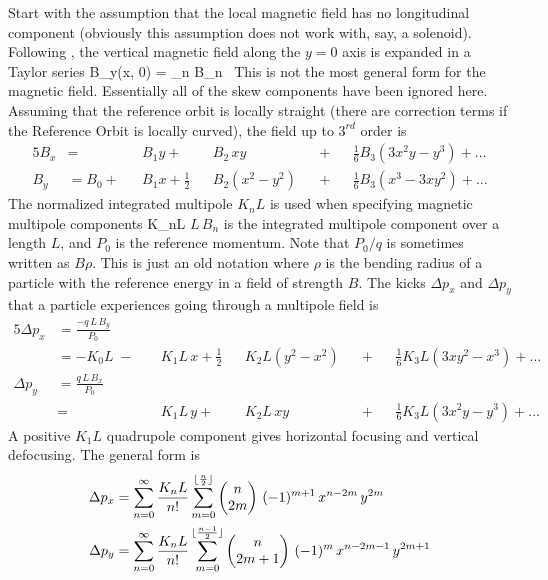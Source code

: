 Start with the assumption that the local magnetic field has no
longitudinal component (obviously this assumption does not work with,
say, a solenoid).  Following \mad, the vertical magnetic field along
the $y = 0$ axis is expanded in a Taylor series
\Begineq
  B_y(x, 0) = \sum_n B_n \, 
\Endeq
This is not the most
general form for the magnetic field. Essentially all of the skew
components have been ignored here. Assuming that the
reference orbit is locally straight (there are correction terms if the
Reference Orbit is locally curved), the field up to $3^{rd}$ order is
\begin{alignat}{5}
  B_x &=           &&B_1 y \plus         &&B_2 \, xy       && \plus && \frac{1}{6} B_3 (3x^2 y - y^3) \plus \ldots \\
  B_y &= B_0 \plus &&B_1 x + \frac{1}{2} &&B_2 (x^2 - y^2) && \plus && \frac{1}{6} B_3 (x^3 - 3x y^2) \plus \ldots
\end{alignat}
The normalized integrated multipole $K_nL$ is used when specifying magnetic
multipole components
\Begineq
  K_nL \equiv {}
\Endeq
$L \, B_n$ is the integrated multipole component over a length $L$,
and $P_0$ is the reference momentum. Note that $P_0/q$ is sometimes
written as $B\rho$. This is just an old notation where $\rho$ is the
bending radius of a particle with the reference energy in a field of
strength $B$. The kicks $\Delta p_x$ and $\Delta p_y$ that a
particle experiences going through a multipole field is
\begin{alignat}{5}
  \Delta p_x & = \frac{-q \, L \, B_y}{P_0} \\
             & = -K_0 L \;-\; 
             && K_1 L \, x \plus 
             \frac{1}{2} && K_2 L (y^2 - x^2) && \plus 
             && \frac{1}{6} K_3 L (3x y^2 - x^3) \plus \ldots 
             \nonumber \\
  \Delta p_y & = \frac{q \, L \, B_x}{P_0} \\
             & =     
             && K_1 L \, y \plus 
             && K_2 L \, xy && \plus 
             && \frac{1}{6} K_3L (3x^2 y - y^3) \plus \ldots \nonumber 
\end{alignat}
A positive $K_1L$ quadrupole component gives
horizontal focusing and vertical defocusing. The general form is
\begin{align}
  \Delta p_x &= \sum_{n = 0}^{\infty} \frac{K_n L}{n!} 
             \sum_{m = 0}^{\lfloor \frac{n}{2} \rfloor}
             \begin{pmatrix} n \cr 2m \end{pmatrix} \,
             (-1)^{m+1} \, x^{n-2m} \, y^{2m} \\
  \Delta p_y &= \sum_{n = 0}^{\infty} \frac{K_n L}{n!} 
             \sum_{m = 0}^{\lfloor \frac{n-1}{2} \rfloor}
             \begin{pmatrix} n \cr 2m+1 \end{pmatrix} \,
             (-1)^{m} \, x^{n-2m-1} \, y^{2m+1}
\end{align}

